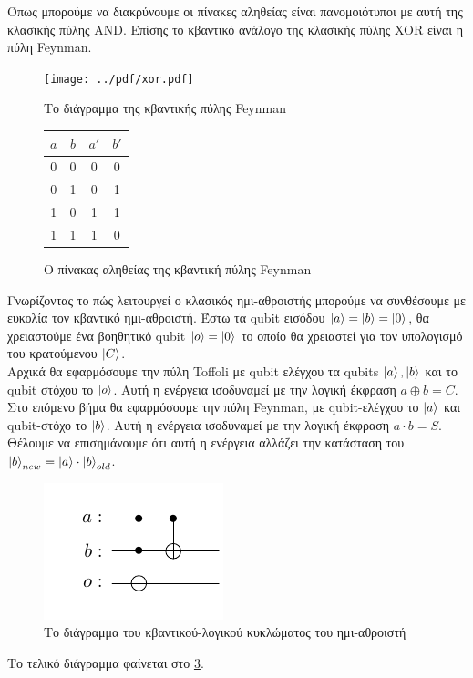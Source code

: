 Όπως μπορούμε να διακρύνουμε οι πίνακες αληθείας είναι πανομοιότυποι με
αυτή της κλασικής πύλης AND. Επίσης το κβαντικό ανάλογο της κλασικής πύλης
XOR είναι η πύλη Feynman.

\begin{figure}[h]
    \label{fig:7}
    \centering
    \texttt{[image: ../pdf/xor.pdf]}
    \caption{Το διάγραμμα της κβαντικής πύλης Feynman}
\end{figure}

\begin{figure}[h]
    \label{fig:8}
    \centering
    \begin{tabular}{c c|c c}
        $a$ & $b$ & $a'$ & $b'$ \\
        \hline
        0 & 0 & 0 & 0 \\
        0 & 1 & 0 & 1 \\
        1 & 0 & 1 & 1 \\
        1 & 1 & 1 & 0 \\
    \end{tabular}
    \caption{Ο πίνακας αληθείας της κβαντική πύλης Feynman}
\end{figure}

Γνωρίζοντας το πώς λειτουργεί ο κλασικός ημι-αθροιστής
μπορούμε να συνθέσουμε με ευκολία τον κβαντικό ημι-αθροιστή.
Έστω τα qubit εισόδου $\ket{a} = \ket{b} = \ket{0}$, θα χρειαστούμε
ένα βοηθητικό qubit $\ket{o} = \ket{0}$ το οποίο θα χρειαστεί για
τον υπολογισμό του κρατούμενου $\ket{C}$.\\

Αρχικά θα εφαρμόσουμε την πύλη Toffoli με qubit ελέγχου τα qubits
$\ket{a}, \ket{b}$ και το qubit στόχου το $\ket{o}$. Αυτή η ενέργεια
ισοδυναμεί με την λογική έκφραση $a \oplus b = C$.\\

Στο επόμενο βήμα θα εφαρμόσουμε την πύλη Feynman, με qubit-ελέγχου
το $\ket{a}$ και qubit-στόχο το $\ket{b}$. Αυτή η ενέργεια
ισοδυναμεί με την λογική έκφραση $a \cdot b = S$. Θέλουμε να επισημάνουμε
ότι αυτή η ενέργεια αλλάζει την κατάσταση του $\ket{b}_{new} = \ket{a} \cdot \ket{b}_{old}$.\\

\begin{figure}
    \label{fig:9}
    \centering
    \includegraphics{../pdf/half_adder.pdf}
    \caption{Το διάγραμμα του κβαντικού-λογικού κυκλώματος του ημι-αθροιστή}
\end{figure}

Το τελικό διάγραμμα φαίνεται στο \ref{fig:9}.


